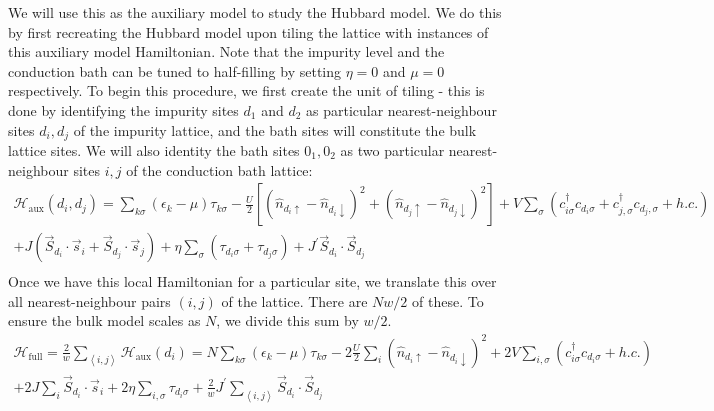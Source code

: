 \documentclass{report}
\numberwithin{equation}{section}
\begin{document}
We will use this as the auxiliary model to study the Hubbard model. We do this by first recreating the Hubbard model upon tiling the lattice with instances of this auxiliary model Hamiltonian. Note that the impurity level and the conduction bath can be tuned to half-filling by setting \(\eta=0\) and \(\mu=0\) respectively. To begin this procedure, we first create the unit of tiling - this is done by identifying the impurity sites \(d_1 \) and \(d_2\) as particular nearest-neighbour sites \(d_i, d_{j}\) of the impurity lattice, and the bath sites will constitute the bulk lattice sites. We will also identity the bath sites \(0_1,0_2\) as two particular nearest-neighbour sites \(i,j\) of the conduction bath lattice:
\begin{equation}\begin{aligned}
	\mathcal{H}_\text{aux}(d_i, d_{j}) = \sum_{k\sigma}\left(\epsilon_k - \mu\right)\tau_{k\sigma} - \frac{U}{2}\left[\left(\hat n_{d_i \uparrow} - \hat n_{d_i \downarrow} \right) ^2 + \left(\hat n_{d_{j} \uparrow} - \hat n_{d_{j} \downarrow} \right) ^2\right] + V \sum_{\sigma} \left(c^\dagger_{i\sigma} c_{d_i\sigma} + c^\dagger_{j,\sigma} c_{d_{j},\sigma} + h.c.\right)\\
 + J \left(\vec{S}_{d_i}\cdot\vec{s}_i + \vec{S}_{d_{j}}\cdot\vec{s}_{j}\right) + \eta \sum_\sigma\left(\tau_{d_i\sigma} + \tau_{d_{j}\sigma}\right)+ J^\prime\vec{S}_{d_i}\cdot\vec{S}_{d_j}\\
\end{aligned}\end{equation}
Once we have this local Hamiltonian for a particular site, we translate this over all nearest-neighbour pairs \((i,j)\) of the lattice. There are \(Nw/2\) of these. To ensure the bulk model scales as \(N\), we divide this sum by \(w/2\). 
\begin{equation}\begin{aligned}
	\mathcal{H}_\text{full} = \frac{2}{w}\sum_{\left<i,j\right>} \mathcal{H}_\text{aux}(d_i) = N\sum_{k\sigma}\left(\epsilon_k - \mu\right)\tau_{k\sigma} - 2\frac{U}{2}\sum_{i}\left(\hat n_{d_i \uparrow} - \hat n_{d_i \downarrow} \right) ^2 + 2V \sum_{i,\sigma} \left(c^\dagger_{i\sigma} c_{d_i\sigma} + h.c.\right) \\
	 + 2J \sum_i\vec{S}_{d_i}\cdot\vec{s}_i + 2\eta \sum_{i,\sigma}\tau_{d_i\sigma} + \frac{2}{w}J^\prime\sum_{\left<i,j\right>}\vec{S}_{d_i}\cdot\vec{S}_{d_j}
\end{aligned}\end{equation}
\end{document}
